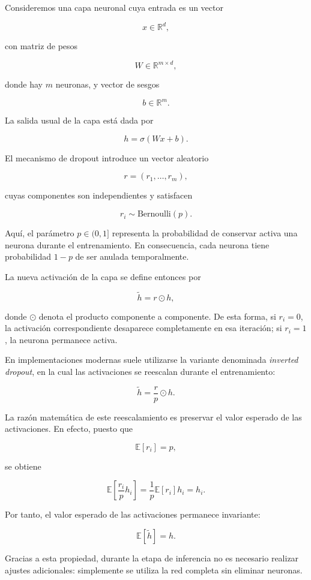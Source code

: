 \documentclass[
  spanish,
  us-letterpaper,
]{scrreprt}
\theoremstyle{definition}
\theoremstyle{remark}
\begin{document}
Consideremos una capa neuronal cuya entrada es un vector

\[
x \in \mathbb{R}^d,
\]

con matriz de pesos

\[
W \in \mathbb{R}^{m \times d},
\]

donde hay \(m\) neuronas, y vector de sesgos

\[
b \in \mathbb{R}^m.
\]

La salida usual de la capa está dada por

\[
h = \sigma(Wx + b).
\]

El mecanismo de dropout introduce un vector aleatorio

\[
r = (r_1, \dots, r_m),
\]

cuyas componentes son independientes y satisfacen

\[
r_i \sim \text{Bernoulli}(p).
\]

Aquí, el parámetro \(p \in (0,1]\) representa la probabilidad de
conservar activa una neurona durante el entrenamiento. En consecuencia,
cada neurona tiene probabilidad \(1-p\) de ser anulada temporalmente.

La nueva activación de la capa se define entonces por

\[
\tilde{h} = r \odot h,
\]

donde \(\odot\) denota el producto componente a componente. De esta
forma, si \(r_i = 0\), la activación correspondiente desaparece
completamente en esa iteración; si \(r_i = 1\), la neurona permanece
activa.

En implementaciones modernas suele utilizarse la variante denominada
\emph{inverted dropout}, en la cual las activaciones se reescalan
durante el entrenamiento:

\[
\tilde{h} = \frac{r}{p} \odot h.
\]

La razón matemática de este reescalamiento es preservar el valor
esperado de las activaciones. En efecto, puesto que

\[
\mathbb{E}[r_i] = p,
\]

se obtiene

\[
\mathbb{E}\left[\frac{r_i}{p} h_i\right]
=
\frac{1}{p}\mathbb{E}[r_i] h_i
=
h_i.
\]

Por tanto, el valor esperado de las activaciones permanece invariante:

\[
\mathbb{E}[\tilde{h}] = h.
\]

Gracias a esta propiedad, durante la etapa de inferencia no es necesario
realizar ajustes adicionales: simplemente se utiliza la red completa sin
eliminar neuronas.
\end{document}
